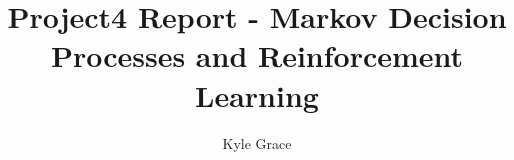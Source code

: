 \documentclass[
	letterpaper, %
]{mlreport}
\author{Kyle Grace}
\title{Project4 Report - Markov Decision Processes and Reinforcement Learning}
\begin{document}

\maketitle

\begin{abstract}

\end{abstract}



\nocite{Mitchell}
\printbibliography
\end{document}
